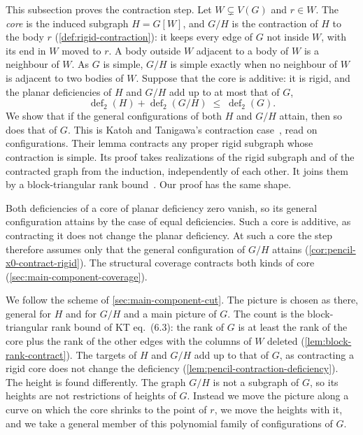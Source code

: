 This subsection proves the contraction step. Let $W \subsetneq V(G)$ and
$r \in W$. The \emph{core} is the induced subgraph $H = G[W]$, and $G/H$
is the contraction of $H$ to the body $r$ (\cref{def:rigid-contraction}):
it keeps every edge of $G$ not inside $W$, with its end in $W$ moved to
$r$. A body outside $W$ adjacent to a body of $W$ is a neighbour of $W$.
As $G$ is simple, $G/H$ is simple exactly when no neighbour of $W$ is
adjacent to two bodies of $W$. Suppose that the core is additive: it is
rigid, and the planar deficiencies of $H$ and $G/H$ add up to at most
that of $G$,
\[
  \operatorname{def}_2(H) + \operatorname{def}_2(G/H) \;\le\;
  \operatorname{def}_2(G).
\]
We show that if the general configurations of both $H$ and $G/H$ attain,
then so does that of $G$. This is Katoh and Tanigawa's contraction
case~\cite[\S6.2, Lemma~6.3]{katohTanigawa2011}, read on configurations.
Their lemma contracts any proper rigid subgraph whose contraction is
simple. Its proof takes realizations of the rigid subgraph and of the
contracted graph from the induction, independently of each other. It
joins them by a block-triangular rank
bound~\cite[pp.~673--675]{katohTanigawa2011}. Our proof has the same
shape.

Both deficiencies of a core of planar deficiency zero vanish, so its
general configuration attains by the case of equal deficiencies. Such a
core is additive, as contracting it does not change the planar
deficiency. At such a core the step therefore assumes only that the
general configuration of $G/H$ attains
(\cref{cor:pencil-x0-contract-rigid}). The structural coverage contracts
both kinds of core (\cref{sec:main-component-coverage}).

We follow the scheme of \cref{sec:main-component-cut}. The picture is
chosen as there, general for $H$ and for $G/H$ and a main picture of
$G$. The count is the block-triangular rank bound of KT eq.~(6.3): the
rank of $G$ is at least the rank of the core plus the rank of the other
edges with the columns of $W$ deleted (\cref{lem:block-rank-contract}).
The targets of $H$ and $G/H$ add up to that of $G$, as contracting a
rigid core does not change the deficiency
(\cref{lem:pencil-contraction-deficiency}). The height is found
differently. The graph $G/H$ is not a subgraph of $G$, so its heights
are not restrictions of heights of $G$. Instead we move the picture
along a curve on which the core shrinks to the point of $r$, we move the
heights with it, and we take a general member of this polynomial family
of configurations of $G$.

